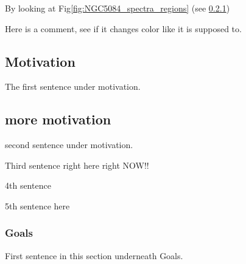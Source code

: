 \documentclass[modern]{CORE-AAS/aastex631}
\begin{document}
{By looking at Fig\ref{fig:NGC5084_spectra_regions} (see \ref{subsub:goals})

Here is a comment, see if it changes color like it is supposed to. 
\subsection{Motivation} %
\label{sub:motivation}

The first sentence under motivation. \citep{bernardi+2006aj131_1288}




\subsection{more motivation}
\label{sub:more_motivation}

second sentence under motivation.

Third sentence right here right NOW!! 


4th sentence

5th sentence here 

\subsubsection{Goals}
\label{subsub:goals}
First sentence in this section underneath Goals. 

}
\end{document}
